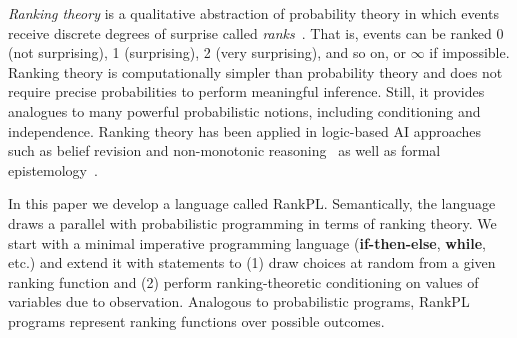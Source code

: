 \documentclass{llncs}
\begin{document}
\emph{Ranking theory} is a qualitative abstraction of probability theory in which events receive discrete degrees of surprise called \emph{ranks}~\cite{DBLP:books/daglib/0035277}.
That is, events can be ranked 0 (not surprising), 1 (surprising), 2 (very surprising), and so on, or $\infty$ if impossible.
Ranking theory is computationally simpler than probability theory and does not require precise probabilities to perform meaningful inference. 
Still, it provides analogues to many powerful probabilistic notions, including conditioning and independence.
Ranking theory has been applied in logic-based AI approaches 
		such as belief revision and non-monotonic reasoning~\cite{DBLP:dblp_journals/ai/DarwicheP97,goldszmidt1996qualitative} 
		as well as formal epistemology~\cite{DBLP:books/daglib/0035277}.

In this paper we develop a language called RankPL.
Semantically, the language draws a parallel with probabilistic programming in terms of ranking theory.
We start with a minimal imperative programming language (\textbf{if-then-else}, \textbf{while}, etc.)
	and extend it with statements to
	(1) draw choices at random from a given ranking function and
	(2) perform ranking-theoretic conditioning on values of variables due to observation.
Analogous to probabilistic programs, RankPL programs represent ranking functions over possible outcomes.
\end{document}
